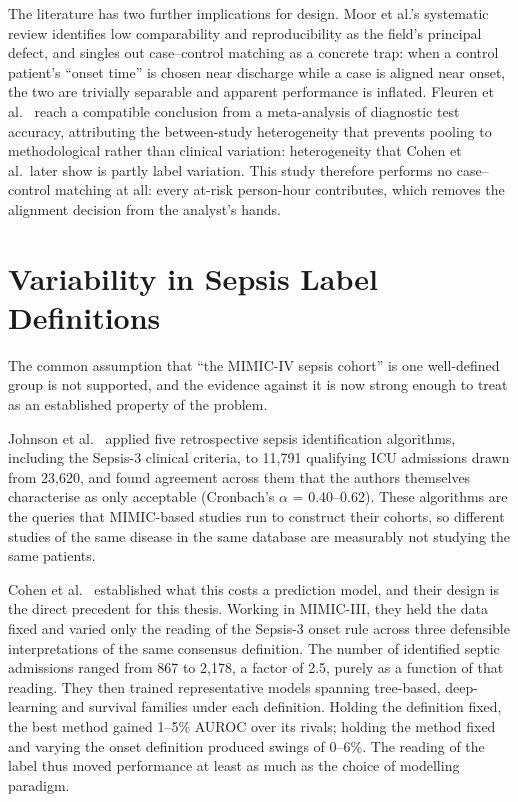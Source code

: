 The literature has two further implications for design. Moor et al.'s
systematic review
\cite{moor2021review} identifies low comparability and reproducibility as the
field's principal defect, and singles out case--control matching as a concrete
trap: when a control patient's ``onset time'' is chosen near discharge while a
case is aligned near onset, the two are trivially separable and apparent
performance is inflated. Fleuren et al.\ \cite{fleuren2020ml} reach a
compatible conclusion from a meta-analysis of diagnostic test accuracy,
attributing the between-study heterogeneity that prevents pooling to
methodological rather than clinical variation: heterogeneity that Cohen et
al.\ later show is partly label variation. This study therefore performs no
case--control matching at all: every at-risk person-hour contributes, which
removes the alignment decision from the analyst's hands.


\section{Variability in Sepsis Label Definitions}
\label{sec:label_object}

The common assumption that ``the MIMIC-IV sepsis cohort'' is one well-defined
group is not supported, and the evidence against it is now strong enough to
treat as an established property of the problem.

Johnson et al.\ \cite{johnson2018comparative} applied five retrospective sepsis
identification algorithms, including the Sepsis-3 clinical criteria, to
11,791 qualifying ICU admissions drawn from 23,620, and found agreement across
them that the authors themselves characterise as only acceptable (Cronbach's
$\alpha$ = 0.40--0.62). These algorithms are the queries that MIMIC-based
studies run to construct their cohorts, so different studies of the same
disease in the same database are measurably not studying the same patients.

Cohen et al.\ \cite{cohen2024subtle} established what this costs a prediction
model, and their design is the direct precedent for this thesis. Working in
MIMIC-III, they held the data fixed and varied only the reading of the
Sepsis-3 onset rule across three defensible interpretations of the same
consensus definition. The number of identified septic admissions ranged from
867 to 2,178, a factor of 2.5, purely as a function of that reading. They
then trained representative models spanning tree-based, deep-learning and
survival families under each definition. Holding the definition fixed, the best
method gained 1--5\% AUROC over its rivals; holding the method fixed and
varying the onset definition produced swings of 0--6\%. The reading of the
label thus moved performance at least as much as the choice of modelling
paradigm.


